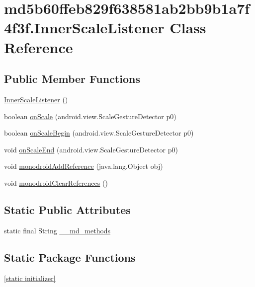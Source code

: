 \hypertarget{classmd5b60ffeb829f638581ab2bb9b1a7f4f3f_1_1_inner_scale_listener}{
\section{md5b60ffeb829f638581ab2bb9b1a7f4f3f.InnerScaleListener Class Reference}
\label{classmd5b60ffeb829f638581ab2bb9b1a7f4f3f_1_1_inner_scale_listener}
}
\subsection*{Public Member Functions}
\begin{CompactItemize}
\item 
\hyperlink{classmd5b60ffeb829f638581ab2bb9b1a7f4f3f_1_1_inner_scale_listener_12a0b72776e59c364a18348c23d994c1}{InnerScaleListener} ()
\item 
boolean \hyperlink{classmd5b60ffeb829f638581ab2bb9b1a7f4f3f_1_1_inner_scale_listener_9541f867e31a3ee001b6454b9dd02067}{onScale} (android.view.ScaleGestureDetector p0)
\item 
boolean \hyperlink{classmd5b60ffeb829f638581ab2bb9b1a7f4f3f_1_1_inner_scale_listener_ce0e9a6c5689492acdb304345237b013}{onScaleBegin} (android.view.ScaleGestureDetector p0)
\item 
void \hyperlink{classmd5b60ffeb829f638581ab2bb9b1a7f4f3f_1_1_inner_scale_listener_d1e5c4a080a15064afa8a879af6de198}{onScaleEnd} (android.view.ScaleGestureDetector p0)
\item 
void \hyperlink{classmd5b60ffeb829f638581ab2bb9b1a7f4f3f_1_1_inner_scale_listener_376dba1ab8327e4c25355f35bae0a8d7}{monodroidAddReference} (java.lang.Object obj)
\item 
void \hyperlink{classmd5b60ffeb829f638581ab2bb9b1a7f4f3f_1_1_inner_scale_listener_642366a6c026d7fa42238967fa2abb21}{monodroidClearReferences} ()
\end{CompactItemize}
\subsection*{Static Public Attributes}
\begin{CompactItemize}
\item 
static final String \hyperlink{classmd5b60ffeb829f638581ab2bb9b1a7f4f3f_1_1_inner_scale_listener_e1c1d8dc7c8fd6e763b6ea898d8955fd}{\_\-\_\-md\_\-methods}
\end{CompactItemize}
\subsection*{Static Package Functions}
\begin{CompactItemize}
\item 
\hyperlink{classmd5b60ffeb829f638581ab2bb9b1a7f4f3f_1_1_inner_scale_listener_4495d946e784bb54697d3a93ee59db2c}{\mbox{[}static initializer\mbox{]}}
\end{CompactItemize}
